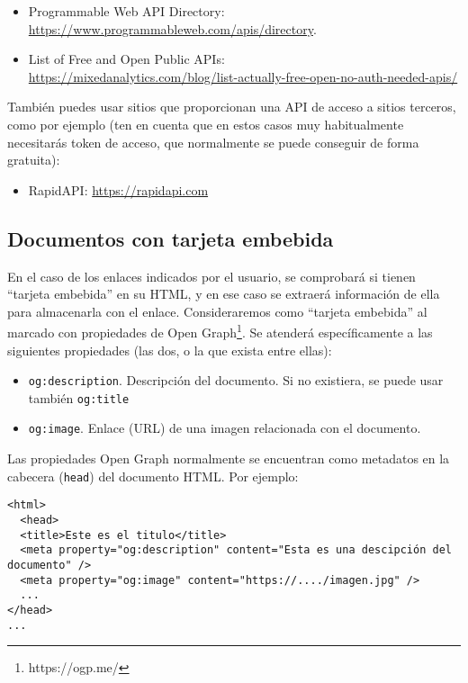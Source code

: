 \begin{itemize}
\item Programmable Web API Directory: \\
  \url{https://www.programmableweb.com/apis/directory}.
\item List of Free and Open Public APIs: \\
  \url{https://mixedanalytics.com/blog/list-actually-free-open-no-auth-needed-apis/}
\end{itemize}

También puedes usar sitios que proporcionan una API de acceso a sitios terceros, como por ejemplo (ten en cuenta que en estos casos muy habitualmente necesitarás token de acceso, que normalmente se puede conseguir de forma gratuita):

\begin{itemize}
\item RapidAPI: \url{https://rapidapi.com}
\end{itemize}

\subsection{Documentos con tarjeta embebida}
\label{sec:practica-final-2022-05:tarjeta}

En el caso de los enlaces indicados por el usuario, se comprobará si tienen ``tarjeta embebida'' en su HTML, y en ese caso se extraerá información de ella para almacenarla con el enlace. Consideraremos como ``tarjeta embebida'' al marcado con propiedades de Open Graph\footnote{https://ogp.me/}. Se atenderá específicamente a las siguientes propiedades (las dos, o la que exista entre ellas):

\begin{itemize}
\item \texttt{og:description}. Descripción del documento. Si no existiera, se puede usar también \texttt{og:title}
\item \texttt{og:image}. Enlace (URL) de una imagen relacionada con el documento.
\end{itemize}

Las propiedades Open Graph normalmente se encuentran como metadatos en la cabecera (\texttt{head}) del documento HTML. Por ejemplo:

\begin{verbatim}
<html>
  <head>
  <title>Este es el titulo</title>
  <meta property="og:description" content="Esta es una descipción del documento" />
  <meta property="og:image" content="https://..../imagen.jpg" />
  ...
</head>
...
\end{verbatim}

